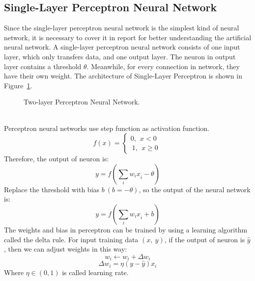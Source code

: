 \documentclass[]{UCD_CS_FYP_Report}
\begin{document}
\subsection{Single-Layer Perceptron Neural Network}
Since the single-layer perceptron neural network is the simplest kind of neural network, it is necessary to cover it in report for better understanding the artificial neural network. A single-layer perceptron neural network consists of one input layer, which only transfers data, and one output layer. The neuron in output layer contains a threshold $\theta{}$. Meanwhile, for every connection in network, they have their own weight. The architecture of Single-Layer Perceptron is shown in Figure~\ref{fig:Perceptron_Neural_Network}.
\begin{figure}[h]
\centering
\fboxsep 2mm
\caption{\label{fig:Perceptron_Neural_Network} Two-layer Perceptron Neural Network.}
\end{figure}
\\Perceptron neural networks use step function as activation function.
\begin{equation}
f\left(x\right)=\left\{\begin{array}{l}0,\ \ x<0 \\
\ 1,\ \ x\geq{}0\ \end{array}\right.
\end{equation}
Therefore, the output of neuron is: 
\begin{equation}
y=f\left(\sum_i{w_ix}_i-\theta{}\right)
\end{equation}
Replace the threshold with bias $b\ (b=-\theta{})$, so the output of the neural network is:
\begin{equation}
y=f\left(\sum_i{w_ix}_i+b\right)
\end{equation}
The weights and bias in perceptron can be trained by using a learning algorithm called the delta rule. For input training data $(x,\ y)$, if the output of neuron is $\hat{y}$, then we can adjust weights in this way:
\begin{equation}
w_i\leftarrow{}w_i+\Delta{}w_i
\end{equation}
\begin{equation}
\Delta{}w_i=\eta{}\left(y-\hat{y}\right)x_i
\end{equation}
Where $\eta{}\in{}(0,1)$ is called learning rate.
%
\end{document}
